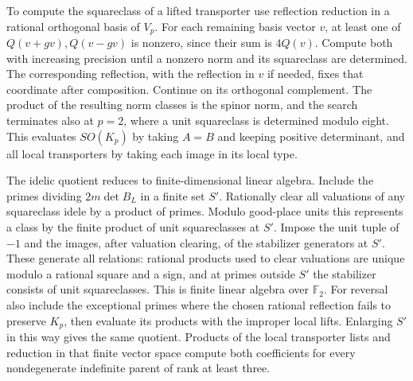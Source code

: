 To compute the squareclass of a lifted transporter use reflection reduction in a rational orthogonal basis of \(V_p\). For each remaining basis vector \(v\), at least one of \(Q(v+gv),Q(v-gv)\) is nonzero, since their sum is \(4Q(v)\). Compute both with increasing precision until a nonzero norm and its squareclass are determined. The corresponding reflection, with the reflection in \(v\) if needed, fixes that coordinate after composition. Continue on its orthogonal complement. The product of the resulting norm classes is the spinor norm, and the search terminates also at \(p=2\), where a unit squareclass is determined modulo eight. This evaluates \(SO(K_p)\) by taking \(A=B\) and keeping positive determinant, and all local transporters by taking each image in its local type.

The idelic quotient reduces to finite-dimensional linear algebra. Include the primes dividing \(2m\det B_L\) in a finite set \(S'\). Rationally clear all valuations of any squareclass idele by a product of primes. Modulo good-place units this represents a class by the finite product of unit squareclasses at \(S'\). Impose the unit tuple of \(-1\) and the images, after valuation clearing, of the stabilizer generators at \(S'\). These generate all relations: rational products used to clear valuations are unique modulo a rational square and a sign, and at primes outside \(S'\) the stabilizer consists of unit squareclasses. This is finite linear algebra over \(\mathbb F_2\). 
For reversal also include the exceptional primes where the chosen rational reflection fails to preserve \(K_p\), then evaluate its products with the improper local lifts. Enlarging \(S'\) in this way gives the same quotient. Products of the local transporter lists and reduction in that finite vector space compute both coefficients for every nondegenerate indefinite parent of rank at least three.

